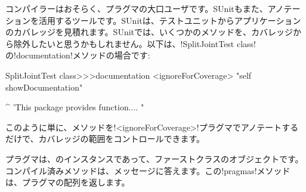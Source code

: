 \documentclass[a4paper,10pt,twoside]{book}
\begin{document}
コンパイラーはおそらく、プラグマの大口ユーザです。SUnitもまた、アノテーションを活用するツールです。SUnitは、テストユニットからアプリケーションのカバレッジを見積れます。SUnitでは、いくつかのメソッドを、カバレッジから除外したいと思うかもしれません。以下は、\ct!SplitJointTest class!の\ct!documentation!メソッドの場合です:

\begin{code}{}
SplitJointTest class>>>documentation
	<ignoreForCoverage>
	"self showDocumentation"
	
	^ 'This package provides function.... "
\end{code}

このように単に、メソッドを\ct!<ignoreForCoverage>!プラグマでアノテートするだけで、カバレッジの範囲をコントロールできます。


%	


プラグマは、のインスタンスであって、ファーストクラスのオブジェクトです。コンパイル済みメソッドは、メッセージに答えます。この\ct!pragmas!メソッドは、プラグマの配列を返します。
\end{document}
